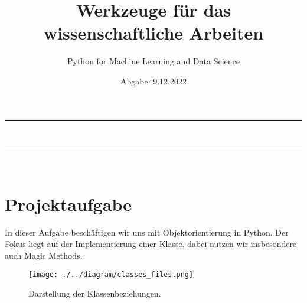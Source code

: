 \documentclass[]{scrartcl}
\title{Werkzeuge für das wissenschaftliche Arbeiten}
\subtitle{Python for Machine Learning and Data Science}
\date{Abgabe: 9.12.2022}
\begin{document}
    \maketitle

    \hrule\hfill\\[0.2cm]

    \tableofcontents

    \hrule\hfill\\[0.2cm]

    \section{Projektaufgabe}
    In dieser Aufgabe beschäftigen wir uns mit Objektorientierung in Python. Der Fokus liegt auf der Implementierung einer Klasse, dabei nutzen wir insbesondere auch Magic Methods.\\

    \begin{figure}[h!]
  		\texttt{[image: ./../diagram/classes\_files.png]}
  		\caption{Darstellung der Klassenbeziehungen.}
	\end{figure}
\end{document}
